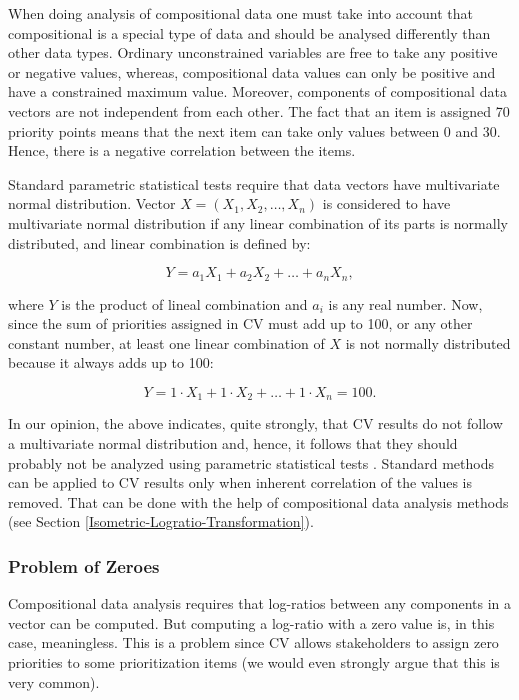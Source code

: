 
When doing analysis of compositional data one must take into account that compositional is a special type of data and should be analysed differently than other data types.
Ordinary unconstrained variables are free to take any positive or negative values,
whereas, compositional data values can only be positive and have a constrained maximum value.
Moreover, components of compositional data vectors are not independent from each other.
The fact that an item is assigned 70 priority points means that the next item can take only values between 0 and 30.
Hence, there is a negative correlation between the items.

Standard parametric statistical tests require that data vectors have multivariate normal distribution.
Vector $X=(X_{1}, X_{2}, \ldots, X_{n})$
is considered to have multivariate normal distribution if any linear
combination of its parts is normally distributed, and linear combination
is defined by:

\begin{equation}
	Y=a_{1}X_{1}+a_{2}X_{2}+\ldots+a_{n}X_{n},
\end{equation}

where $Y$ is the product of lineal combination and $a_{i}$ is any
real number. Now, since the sum of priorities assigned in CV must add up
to 100, or any other constant number, at least one linear combination
of $X$ is not normally distributed because it always adds up to
100:

\begin{equation}
	Y=1\cdot X_{1}+1\cdot X_{2}+\ldots+1\cdot X_{n}=100.
\end{equation}

In our opinion, the above indicates, quite strongly,
that CV results do not follow a multivariate normal distribution 
and, hence, it follows that they should probably not be
analyzed using parametric statistical tests \cite{Pawlowsky-Glahn2006}.
Standard methods can be applied to CV results only when inherent correlation of the values is removed.
That can be done with the help of compositional data analysis methods (see Section \ref{Isometric-Logratio-Transformation}).

\subsubsection{\label{Problem-of-Zeroes}Problem of Zeroes}
Compositional data analysis requires that log-ratios between any components in a vector can be
computed. But computing a log-ratio with a zero value is, in this case, meaningless. This is
a problem since CV allows stakeholders to assign zero priorities
to some prioritization items (we would even strongly argue that this is very common). 

